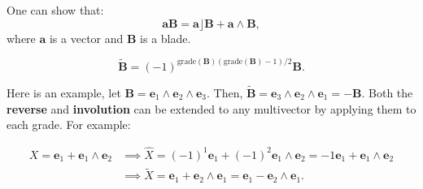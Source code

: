 One can show that:
\begin{displaymath}
    \mathbf{a B} = \mathbf a \rfloor \mathbf B + \mathbf a \wedge \mathbf B,
\end{displaymath}
where $\mathbf a$ is a vector and $\mathbf B$ is a blade.


\begin{definition}
    \begin{displaymath}
        \tilde{\mathbf B} = (-1) ^{\text{grade}(\mathbf B)(\text{grade}(\mathbf B)-1)/2} \mathbf B.
    \end{displaymath}
\end{definition}
Here is an example, let $\mathbf B = \mathbf e_1 \wedge \mathbf e_2 \wedge \mathbf e_3$. Then,
$\tilde{\mathbf B} = \mathbf e_3 \wedge \mathbf e_2 \wedge \mathbf e_1 = -\mathbf B$.
Both the \textbf{reverse} and \textbf{involution} can be extended to any multivector by applying them to each grade. For example:

\begin{align}
    X = \mathbf e_1 + \mathbf e_1 \wedge \mathbf e_2 & \implies
    \hat{X} = (-1)^1 \mathbf e_1 + (-1)^{2} \mathbf e_1 \wedge \mathbf e_2 = -1 \mathbf e_1 +  \mathbf e_1 \wedge \mathbf e_2
    \\
    & \implies
    \tilde{X} = \mathbf e_1 + \mathbf e_2 \wedge \mathbf e_1 = \mathbf e_1 - \mathbf e_2 \wedge \mathbf e_1.
\end{align}



